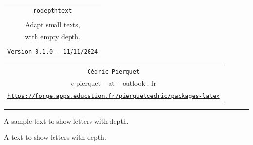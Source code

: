 \documentclass[11pt,a4paper]{ltxdoc}
\def\TPversion{0.1.0}
\def\TPdate{11/11/2024}
\begin{document}
\thispagestyle{empty}

\begin{center}
	\begin{minipage}{0.88\linewidth}
		\begin{tcolorbox}[colframe=yellow,colback=yellow!15]
			\begin{center}
				\renewcommand{\arraystretch}{1.25}%
				\begin{tabular}{c}
					{\Huge \texttt{nodepthtext}}\\
					\\
					{\LARGE Adapt small texts,} \\
					{\LARGE with empty depth.} \\
					\\
					{\small \texttt{Version \TPversion{} -- \TPdate}}
				\end{tabular}
			\end{center}
		\end{tcolorbox}
	\end{minipage}
\end{center}

\begin{center}
	\begin{tabular}{c}
		\texttt{Cédric Pierquet}\\
		{\ttfamily c pierquet -- at -- outlook . fr}\\
		\texttt{\url{https://forge.apps.education.fr/pierquetcedric/packages-latex}} \\
	\end{tabular}
\end{center}

\hrule

\vfill

\begin{tcolorbox}[colframe=lightgray,colback=lightgray!5]
A sample text to show letters with depth.\\
\end{tcolorbox}

\begin{tcolorbox}[colframe=lightgray,colback=lightgray!5]
{\LARGE\ttfamily A text to show letters with depth.}\\
{\LARGE\ttfamily{}}\\
{\LARGE\ttfamily{}}
\end{tcolorbox}
\end{document}
